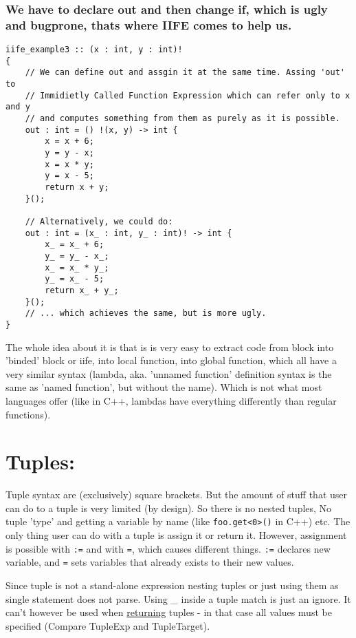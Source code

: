 \documentclass[11pt]{article}
\begin{document}
\subsubsection*{We have to declare out and then change if, which is ugly and bugprone, thats where IIFE comes to help us.}
\label{sec:orgd3aaf22}
\begin{verbatim}
iife_example3 :: (x : int, y : int)!
{
    // We can define out and assgin it at the same time. Assing 'out' to
    // Immidietly Called Function Expression which can refer only to x and y
    // and computes something from them as purely as it is possible.
    out : int = () !(x, y) -> int {
        x = x + 6;
        y = y - x;
        x = x * y;
        y = x - 5;
        return x + y;
    }();

    // Alternatively, we could do:
    out : int = (x_ : int, y_ : int)! -> int {
        x_ = x_ + 6;
        y_ = y_ - x_;
        x_ = x_ * y_;
        y_ = x_ - 5;
        return x_ + y_;
    }();
    // ... which achieves the same, but is more ugly.
}
\end{verbatim}

The whole idea about it is that is is very easy to extract code from block
into 'binded' block or iife, into local function, into global function,
which all have a very similar syntax (lambda, aka. 'unnamed function'
definition syntax is the same as 'named function', but without the
name). Which is not what most languages offer (like in C++, lambdas have
everything differently than regular functions).

\section*{Tuples:}
\label{sec:org5095640}

Tuple syntax are (exclusively) square brackets. But the amount of stuff that
user can do to a tuple is very limited (by design). So there is no nested
tuples, No tuple 'type' and getting a variable by name (like
\texttt{foo.get<0>()} in C++) etc.  The only thing user can do with a tuple is
assign it or return it. However, assignment is possible with \texttt{:=} and
with \texttt{=}, which causes different things. \texttt{:=} declares new
variable, and \texttt{=} sets variables that already exists to their new
values.

Since tuple is not a stand-alone expression nesting tuples or just using them
as single statement does not parse. Using \_ inside a tuple match is just an
ignore. It can't however be used when \uline{returning} tuples - in that case all
values must be specified (Compare TupleExp and TupleTarget).
\end{document}
